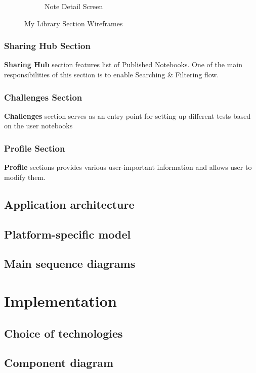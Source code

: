 \documentclass[thesis=B,english]{FITthesis}[2012/10/20]
\begin{document}
\begin{figure}
\begin{subfigure}{.5\textwidth}
  \caption{Note Detail Screen}
  \label{fig:detail}
\end{subfigure}

\caption{My Library Section Wireframes}
\label{fig:section-library}
\end{figure}

\subsection{Sharing Hub Section}

\textbf{Sharing Hub} section features list of Published Notebooks. One of the main responsibilities of this section is to enable Searching \& Filtering flow. 
\subsection{Challenges Section}

\textbf{Challenges} section serves as an entry point for setting up different tests based on the user notebooks
\subsection{Profile Section}

\textbf{Profile} sections provides various user-important information and allows user to modify them.

\section{Application architecture}
\section{Platform-specific model}
\section{Main sequence diagrams}

\chapter{Implementation}
\section{Choice of technologies}
\section{Component diagram}
\end{document}
